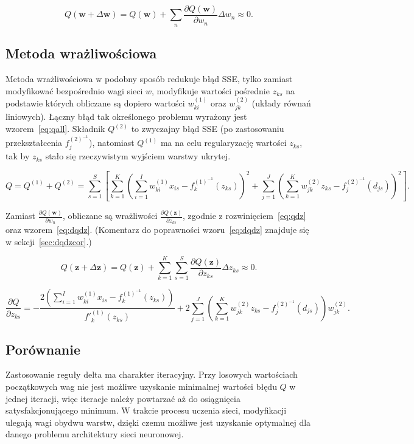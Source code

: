 \documentclass[11pt,a4paper]{article}
\begin{document}
\begin{equation}
Q(\bm{w} + \Delta \bm{w}) = Q(\bm{w}) + \sum_{n} \frac{\partial Q(\bm{w})}{\partial w_{n}} \Delta w_{n} \approx 0.
\label{eq:taylor}
\end{equation}

\subsection{Metoda wrażliwościowa}
Metoda wrażliwościowa w podobny sposób redukuje błąd SSE, tylko zamiast modyfikować bezpośrednio wagi sieci $w$, modyfikuje wartości pośrednie $z_{ks}$ na podstawie których obliczane są dopiero wartości $w^{(1)}_{ki}$ oraz $w^{(2)}_{jk}$ (układy równań liniowych). Łączny błąd tak określonego problemu wyrażony jest wzorem~\ref{eq:qall}. Składnik $Q^{(2)}$ to zwyczajny błąd SSE (po zastosowaniu przekształcenia $f_j^{(2)^{-1}}$), natomiast $Q^{(1)}$ ma na celu regularyzację wartości $z_{ks}$, tak by $z_{ks}$ stało się rzeczywistym wyjściem warstwy ukrytej.

\begin{equation}
Q = Q^{(1)} + Q^{(2)} = \sum_{s=1}^{S} \left[ \sum_{k=1}^{K} \left( \sum_{i=1}^{I} w^{(1)}_{ki} x_{is} - f^{(1)^{-1}}_k(z_{ks}) \right)^{2} + \sum_{j=1}^{J} \left( \sum_{k=1}^{K} w^{(2)}_{jk} z_{ks} - f^{(2)^{-1}}_j(d_{js}) \right)^{2} \right].
\label{eq:qall}
\end{equation}

\noindent Zamiast $\frac{\partial Q(\bm{w})}{\partial w_n}$, obliczane są wrażliwości $\frac{\partial Q(\bm{z})}{\partial z_{ks}}$, zgodnie z rozwinięciem~\ref{eq:qdz} oraz wzorem~\ref{eq:dqdz}. (Komentarz do poprawności wzoru~\ref{eq:dqdz} znajduje się w sekcji~\ref{sec:dqdzcor}.)

\begin{equation}
Q(\bm{z} + \Delta \bm{z}) = Q(\bm{z}) + \sum_{k=1}^{K}\sum_{s=1}^{S} \frac{\partial Q(\bm{z})}{\partial z_{ks}} \Delta z_{ks} \approx 0.
\label{eq:qdz}
\end{equation}

\begin{equation}
\frac{\partial Q}{\partial z_{ks}} = -\frac{2 \left( \sum_{i=1}^{I} w^{(1)}_{ki} x_{is} - f^{(1)^{-1}}_k(z_{ks}) \right)}{f'^{(1)}_k(z_{ks})} + 2 \sum_{j=1}^{J} \left( \sum_{k=1}^{K} w^{(2)}_{jk} z_{ks} - f^{(2)^{-1}}_j(d_{js}) \right) w^{(2)}_{jk}.
\label{eq:dqdz}
\end{equation}

\subsection{Porównanie}
Zastosowanie reguły delta ma charakter iteracyjny. Przy losowych wartościach początkowych wag nie jest możliwe uzyskanie minimalnej wartości błędu $Q$ w jednej iteracji, więc iteracje należy powtarzać aż do osiągnięcia satysfakcjonującego minimum. W trakcie procesu uczenia sieci, modyfikacji ulegają wagi obydwu warstw, dzięki czemu możliwe jest uzyskanie optymalnej dla danego problemu architektury sieci neuronowej.
\end{document}
